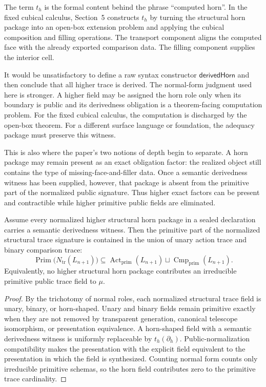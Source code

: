 The term \(t_h\) is the formal content behind the phrase ``computed horn''.  In the fixed
cubical calculus, Section~5 constructs \(t_h\) by turning the structural horn package into an
open-box extension problem and applying the cubical composition and filling operations.  The
transport component aligns the computed face with the already exported comparison data.
The filling component supplies the interior cell.

\begin{remark}
It would be unsatisfactory to define a raw syntax constructor
\(\mathsf{derivedHorn}\) and then conclude that all higher trace is derived.  The normal-form
judgment used here is stronger.  A higher field may be assigned the horn role only when its
boundary is public and its derivedness obligation is a theorem-facing computation problem.
For the fixed cubical calculus, the computation is discharged by the open-box theorem.  For a
different surface language or foundation, the adequacy package must preserve this witness.
\end{remark}

This is also where the paper's two notions of depth begin to separate.  A horn package may
remain present as an exact obligation factor: the realized object still contains the type of
missing-face-and-filler data.  Once a semantic derivedness witness has been supplied, however,
that package is absent from the primitive part of the normalized public signature.  Thus
higher exact factors can be present and contractible while higher primitive public fields are
eliminated.

\begin{proposition}
Assume every normalized higher structural horn package in a sealed declaration carries a
semantic derivedness witness.  Then the primitive part of the normalized structural trace
signature is contained in the union of unary action trace and binary comparison trace:
\[
  \operatorname{Prim}\bigl(N_{\mathrm{tr}}(L_{n+1})\bigr)
  \subseteq
  \operatorname{Act}_{\mathrm{prim}}(L_{n+1})
  \sqcup
  \operatorname{Cmp}_{\mathrm{prim}}(L_{n+1}).
\]
Equivalently, no higher structural horn package contributes an irreducible primitive public
trace field to \(\mu\).
\end{proposition}

\begin{proof}
By the trichotomy of normal roles, each normalized structural trace field is unary, binary,
or horn-shaped.  Unary and binary fields remain primitive exactly when they are not removed
by transparent generation, canonical telescope isomorphism, or presentation equivalence.  A
horn-shaped field with a semantic derivedness witness is uniformly replaceable by
\(t_h(\partial_h)\).  Public-normalization compatibility makes the presentation with the
explicit field equivalent to the presentation in which the field is synthesized.  Counting
normal form counts only irreducible primitive schemas, so the horn field contributes zero to
the primitive trace cardinality.
\end{proof}

